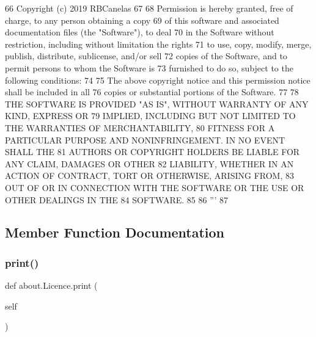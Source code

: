 \begin{DoxyCode}
66 \textcolor{stringliteral}{    Copyright (c) 2019 RBCanelas}
67 \textcolor{stringliteral}{    }
68 \textcolor{stringliteral}{    Permission is hereby granted, free of charge, to any person obtaining a copy}
69 \textcolor{stringliteral}{    of this software and associated documentation files (the "Software"), to deal}
70 \textcolor{stringliteral}{    in the Software without restriction, including without limitation the rights}
71 \textcolor{stringliteral}{    to use, copy, modify, merge, publish, distribute, sublicense, and/or sell}
72 \textcolor{stringliteral}{    copies of the Software, and to permit persons to whom the Software is}
73 \textcolor{stringliteral}{    furnished to do so, subject to the following conditions:}
74 \textcolor{stringliteral}{    }
75 \textcolor{stringliteral}{    The above copyright notice and this permission notice shall be included in all}
76 \textcolor{stringliteral}{    copies or substantial portions of the Software.}
77 \textcolor{stringliteral}{    }
78 \textcolor{stringliteral}{    THE SOFTWARE IS PROVIDED "AS IS", WITHOUT WARRANTY OF ANY KIND, EXPRESS OR}
79 \textcolor{stringliteral}{    IMPLIED, INCLUDING BUT NOT LIMITED TO THE WARRANTIES OF MERCHANTABILITY,}
80 \textcolor{stringliteral}{    FITNESS FOR A PARTICULAR PURPOSE AND NONINFRINGEMENT. IN NO EVENT SHALL THE}
81 \textcolor{stringliteral}{    AUTHORS OR COPYRIGHT HOLDERS BE LIABLE FOR ANY CLAIM, DAMAGES OR OTHER}
82 \textcolor{stringliteral}{    LIABILITY, WHETHER IN AN ACTION OF CONTRACT, TORT OR OTHERWISE, ARISING FROM,}
83 \textcolor{stringliteral}{    OUT OF OR IN CONNECTION WITH THE SOFTWARE OR THE USE OR OTHER DEALINGS IN THE}
84 \textcolor{stringliteral}{    SOFTWARE.}
85 \textcolor{stringliteral}{}
86 \textcolor{stringliteral}{'''}
87         
\end{DoxyCode}


\subsection{Member Function Documentation}
\mbox{\label{classabout_1_1_licence_a9e1e0f8b2a9fb1c4c34f0fac0cfd2b94}} 
\subsubsection{\texorpdfstring{print()}{print()}}
{\footnotesize\ttfamily def about.\+Licence.\+print (\begin{DoxyParamCaption}\item[{}]{self }\end{DoxyParamCaption})}



